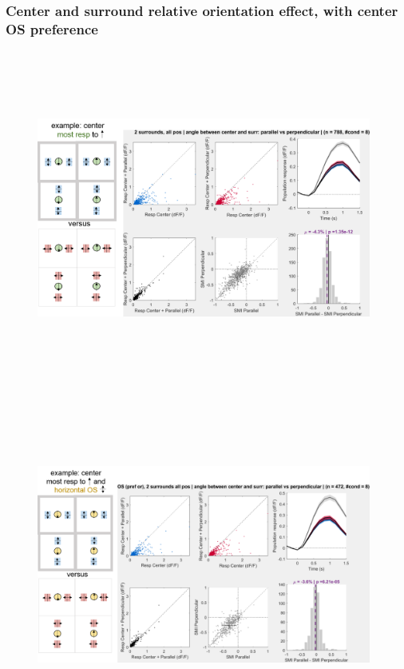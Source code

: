 \subsubsection{Center and surround relative orientation effect, with center OS preference}

\begin{figure}[H] \centering \includegraphics[width=11cm,height=11cm,keepaspectratio]{Figures/7.Results/population/sel/diagrams/8.png} 
\end{figure}

\begin{figure}[H] \centering \includegraphics[width=11cm,height=11cm,keepaspectratio]{Figures/7.Results/population/sel/diagrams/9.png} 
\end{figure}

